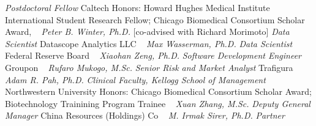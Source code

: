\newline
    \textit{Postdoctoral Fellow}
    \newline
    Caltech
    \newline
    {\footnotesize Honors: Howard Hughes Medical Institute International Student Research Fellow; Chicago Biomedical Consortium Scholar Award, }
    \newline
~
\Gap{}
\textit{Peter B. Winter, Ph.D.}
    [co-advised with Richard Morimoto]
\newline
    \textit{Data Scientist}
    \newline
    Datascope Analytics LLC
    \newline
~
\Gap{}
\textit{Max Wasserman, Ph.D.}
\newline
    \textit{Data Scientist}
    \newline
    Federal Reserve Board
    \newline
~
\Gap{}
\textit{Xiaohan Zeng, Ph.D.}
\newline
    \textit{Software Development Engineer}
    \newline
    Groupon
    \newline
~
\Gap{}
\textit{Rufaro Mukogo, M.Sc.}
\newline
    \textit{Senior Risk and Market Analyst}
    \newline
    Trafigura
    \newline
~
\Gap{}
\textit{Adam R. Pah, Ph.D.}
\newline
    \textit{Clinical Faculty, Kellogg School of Management}
    \newline
    Northwestern University
    \newline
    {\footnotesize Honors: Chicago Biomedical Consortium Scholar Award; Biotechnology Trainining Program Trainee}
    \newline
~
\Gap{}
\textit{Xuan Zhang, M.Sc.}
\newline
    \textit{Deputy General Manager}
    \newline
    China Resources (Holdings) Co
    \newline
~
\Gap{}
\textit{M. Irmak Sirer, Ph.D.}
\newline
    \textit{Partner}
    \newline
